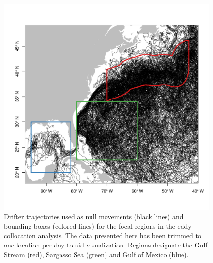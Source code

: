 \begin{figure}[htbp]
\centering
\includegraphics[width=\textwidth]{images/A4_FigS2.pdf}
\caption[Drifter trajectories used as null movements in the eddy collocation analysis]{Drifter trajectories used as null movements (black lines) and bounding boxes (colored lines) for the focal regions in the eddy collocation analysis. The data presented here has been trimmed to one location per day to aid visualization. Regions designate the Gulf Stream (red), Sargasso Sea (green) and Gulf of Mexico (blue).}
\label{fig:a4f2}
\end{figure}

